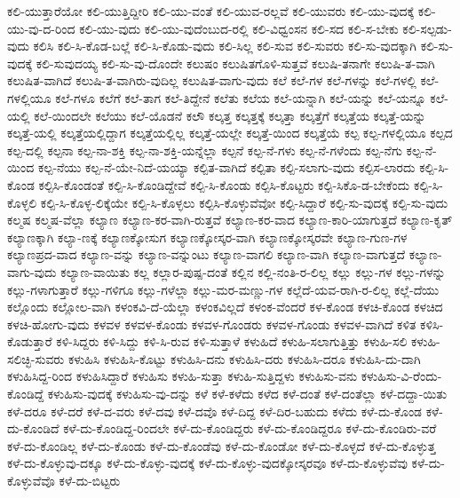 {ಕಲಿ-ಯುತ್ತಾರೆಯೋ
ಕಲಿ-ಯುತ್ತಿದ್ದೀರಿ
ಕಲಿ-ಯು-ವಂತೆ
ಕಲಿ-ಯುವ-ರಲ್ಲವೆ
ಕಲಿ-ಯುವರು
ಕಲಿ-ಯು-ವುದಕ್ಕೆ
ಕಲಿ-ಯು-ವು-ದ-ರಿಂದ
ಕಲಿ-ಯು-ವುದು
ಕಲಿ-ಯು-ವುದೆಂಬುದ-ರಲ್ಲಿ
ಕಲಿ-ವಿಧ್ವಂಸನ
ಕಲಿ-ಸದ
ಕಲಿ-ಸ-ಬೇಕು
ಕಲಿ-ಸಲ್ಪಡು-ವುದು
ಕಲಿಸಿ
ಕಲಿ-ಸಿ-ಕೊಡ-ಬಲ್ಲೆ
ಕಲಿ-ಸಿ-ಕೊಡು-ವುದು
ಕಲಿ-ಸಿಲ್ಲ
ಕಲಿ-ಸುವ
ಕಲಿ-ಸುವರು
ಕಲಿ-ಸು-ವುದಕ್ಕಾಗಿ
ಕಲಿ-ಸು-ವುದಕ್ಕೆ
ಕಲಿ-ಸುವುದಯ್ಯ
ಕಲಿ-ಸು-ವು-ದೊಂದೇ
ಕಲುಷಂ
ಕಲುಷಿತಗೊಳಿ-ಸುತ್ತವೆ
ಕಲುಷಿ-ತನಾಗೇ
ಕಲುಷಿ-ತ-ವಾಗಿ
ಕಲುಷಿತ-ವಾಗಿದೆ
ಕಲುಷಿ-ತ-ವಾಗಿರು-ವುದಿಲ್ಲ
ಕಲುಷಿತ-ವಾಗು-ವುದು
ಕಲೆ
ಕಲೆ-ಗಳ
ಕಲೆ-ಗಳನ್ನು
ಕಲೆ-ಗಳಲ್ಲಿ
ಕಲೆ-ಗಳಲ್ಲಿಯೂ
ಕಲೆ-ಗಳೂ
ಕಲೆಗೆ
ಕಲೆ-ತಾಗ
ಕಲೆ-ತಿದ್ದೇನೆ
ಕಲೆತು
ಕಲೆಯ
ಕಲೆ-ಯನ್ನಾಗಿ
ಕಲೆ-ಯನ್ನು
ಕಲೆ-ಯನ್ನೂ
ಕಲೆ-ಯಲ್ಲಿ
ಕಲೆ-ಯಿಂದಲೇ
ಕಲೆಯು
ಕಲೆ-ಯೊಡನೆ
ಕಲೌ
ಕಲ್ಕತ್ತ
ಕಲ್ಕತ್ತಕ್ಕೆ
ಕಲ್ಕತ್ತಾ
ಕಲ್ಕತ್ತೆಗೆ
ಕಲ್ಕತ್ತೆಯ
ಕಲ್ಕತ್ತೆ-ಯನ್ನು
ಕಲ್ಕತ್ತೆ-ಯಲ್ಲಿ
ಕಲ್ಕತ್ತೆಯಲ್ಲಿದ್ದಾಗ
ಕಲ್ಕತ್ತೆಯಲ್ಲಿಲ್ಲ
ಕಲ್ಕತ್ತೆ-ಯಲ್ಲೇ
ಕಲ್ಕತ್ತೆ-ಯಿಂದ
ಕಲ್ಕತ್ತೆಯೆ
ಕಲ್ಪ
ಕಲ್ಪ-ಗಳಲ್ಲಿಯೂ
ಕಲ್ಪದ
ಕಲ್ಪ-ದಲ್ಲಿ
ಕಲ್ಪನಾ
ಕಲ್ಪ-ನಾ-ಶಕ್ತಿ
ಕಲ್ಪ-ನಾ-ಶಕ್ತಿ-ಯನ್ನೆಲ್ಲಾ
ಕಲ್ಪನೆ
ಕಲ್ಪ-ನೆ-ಗಳು
ಕಲ್ಪ-ನೆ-ಗಳೆಂದು
ಕಲ್ಪ-ನೆಗು
ಕಲ್ಪ-ನೆ-ಯಿಂದ
ಕಲ್ಪ-ನೆಯು
ಕಲ್ಪ-ನೆ-ಯೇ-ನಿದೆ-ಯಯ್ಯಾ
ಕಲ್ಪಿತ-ವಾಗಿದೆ
ಕಲ್ಪಿತಾ
ಕಲ್ಪಿ-ಸಲಾಗು-ವುದು
ಕಲ್ಪಿಸ-ಲಾರದು
ಕಲ್ಪಿ-ಸಿ-ಕೊಂಡ
ಕಲ್ಪಿಸಿ-ಕೊಂಡಂತೆ
ಕಲ್ಪಿ-ಸಿ-ಕೊಂಡಿದ್ದೇವೆ
ಕಲ್ಪಿ-ಸಿ-ಕೊಂಡು
ಕಲ್ಪಿಸಿ-ಕೊಟ್ಟರು
ಕಲ್ಪಿ-ಸಿಕೊ-ಡ-ಬೇಕೆಂದು
ಕಲ್ಪಿ-ಸಿ-ಕೊಳ್ಳಲಿ
ಕಲ್ಪಿ-ಸಿ-ಕೊಳ್ಳ-ಲಿಕ್ಕೆಯೇ
ಕಲ್ಪಿ-ಸಿ-ಕೊಳ್ಳಲು
ಕಲ್ಪಿಸಿ-ಕೊಳ್ಳುವೆವೋ
ಕಲ್ಪಿ-ಸಿದ್ದಾರೆ
ಕಲ್ಪಿ-ಸು-ವುದಕ್ಕೆ
ಕಲ್ಪಿ-ಸು-ವುದು
ಕಲ್ಮಷ
ಕಲ್ಮಷ-ವೆಲ್ಲಾ
ಕಲ್ಯಾಣ
ಕಲ್ಯಾಣ-ಕರ-ವಾಗಿ-ರುತ್ತವೆ
ಕಲ್ಯಾಣ-ಕರ-ವಾದ
ಕಲ್ಯಾಣ-ಕಾರಿ-ಯಾಗುತ್ತದೆ
ಕಲ್ಯಾಣ-ಕೃತ್
ಕಲ್ಯಾಣಕ್ಕಾಗಿ
ಕಲ್ಯಾ-ಣಕ್ಕೆ
ಕಲ್ಯಾಣಕ್ಕೋಸುಗ
ಕಲ್ಯಾಣಕ್ಕೋಸ್ಕರ-ವಾಗಿ
ಕಲ್ಯಾಣಕ್ಕೋಸ್ಕರವೇ
ಕಲ್ಯಾಣ-ಗುಣ-ಗಳ
ಕಲ್ಯಾಣಪ್ರದ-ವಾದ
ಕಲ್ಯಾಣ-ವನ್ನು
ಕಲ್ಯಾಣ-ವನ್ನುಂಟು
ಕಲ್ಯಾಣ-ವಾಗಲಿ
ಕಲ್ಯಾಣ-ವಾಗಿ
ಕಲ್ಯಾಣ-ವಾಗುತ್ತದೆ
ಕಲ್ಯಾಣ-ವಾಗು-ವುದು
ಕಲ್ಯಾಣ-ವಾಯಿತು
ಕಲ್ಲ
ಕಲ್ಲಾರ-ಪುಷ್ಪ-ದಂತೆ
ಕಲ್ಲಿನ
ಕಲ್ಲಿ-ನಂತಿ-ರ-ಲಿಲ್ಲ
ಕಲ್ಲು
ಕಲ್ಲು-ಗಳ
ಕಲ್ಲು-ಗಳನ್ನು
ಕಲ್ಲು-ಗಳಾಗುತ್ತಾರೆ
ಕಲ್ಲು-ಗಳಿಗೂ
ಕಲ್ಲು-ಗಳೆಲ್ಲಾ
ಕಲ್ಲು-ಮರ-ಮಣ್ಣು-ಗಳ
ಕಲ್ಲೆದೆ-ಯವ-ರಾಗಿ-ರ-ಲಿಲ್ಲ
ಕಲ್ಲೆ-ದೆಯು
ಕಲ್ಲೊಂದು
ಕಲ್ಲೋಲ-ವಾಗಿ
ಕಳಂಕವಿ-ದೆ-ಯೆಲ್ಲಾ
ಕಳಂಕವಿಲ್ಲದೆ
ಕಳಂಕ-ವೆಂದರೆ
ಕಳ-ಕೊಂಡ
ಕಳಚಿ-ಕೊಂಡ
ಕಳಚಿದ
ಕಳಚಿ-ಹೋಗು-ವುದು
ಕಳವಳ
ಕಳವಳ-ಕೊಂಡು
ಕಳವಳ-ಗೊಂಡರು
ಕಳವಳ-ಗೊಂಡು
ಕಳವಳ-ವಾಗಿದೆ
ಕಳಿತ
ಕಳಿಸಿ-ಕೊಡುತ್ತಾರೆ
ಕಳಿ-ಸಿದ್ದರು
ಕಳಿ-ಸಿದ್ದು
ಕಳಿ-ಸಿ-ರುವ
ಕಳಿ-ಸುತ್ತಾಳೆ
ಕಳುಹಿದೆ
ಕಳುಹಿ-ಸಲಾಗುತ್ತಿತ್ತು
ಕಳುಹಿ-ಸಲಿ
ಕಳುಹಿ-ಸಲಿಚ್ಛಿ-ಸುವರು
ಕಳುಹಿಸಿ
ಕಳುಹಿಸಿ-ಕೊಟ್ಟು
ಕಳುಹಿಸಿ-ದನು
ಕಳುಹಿಸಿ-ದರು
ಕಳುಹಿಸಿ-ದರೂ
ಕಳುಹಿಸಿ-ದು-ದಾಗಿ
ಕಳುಹಿಸಿದ್ದ-ರಿಂದ
ಕಳುಹಿಸಿದ್ದಾರೆ
ಕಳುಹಿಸು
ಕಳುಹಿ-ಸುತ್ತಾ
ಕಳುಹಿ-ಸುತ್ತಿದ್ದಳು
ಕಳುಹಿಸು-ವನು
ಕಳುಹಿಸು-ವಿ-ರೆಂದು-ಕೊಂಡಿದ್ದೆ
ಕಳುಹಿಸು-ವುದಕ್ಕೆ
ಕಳುಹಿಸು-ವು-ದನ್ನು
ಕಳೆ
ಕಳೆ-ಕಳೆದು
ಕಳೆದ
ಕಳೆ-ದಂತೆ
ಕಳೆ-ದಂತೆಲ್ಲಾ
ಕಳೆ-ದದ್ದಾ-ಯಿತು
ಕಳೆ-ದರೂ
ಕಳೆ-ದರೆ
ಕಳೆ-ದ-ವರು
ಕಳೆ-ದವು
ಕಳೆ-ದವೊ
ಕಳೆ-ದಿದ್ದ
ಕಳೆ-ದಿರ-ಬಹುದು
ಕಳೆದು
ಕಳೆ-ದು-ಕೊಂಡ
ಕಳೆ-ದು-ಕೊಂಡಿದೆ
ಕಳೆ-ದು-ಕೊಂಡಿದ್ದ-ರಿಂದಲೇ
ಕಳೆ-ದು-ಕೊಂಡಿದ್ದರು
ಕಳೆ-ದು-ಕೊಂಡಿದ್ದರೂ
ಕಳೆ-ದು-ಕೊಂಡಿರು-ವರೆ
ಕಳೆ-ದು-ಕೊಂಡಿಲ್ಲ
ಕಳೆ-ದು-ಕೊಂಡು
ಕಳೆ-ದು-ಕೊಂಡೆವು
ಕಳೆ-ದು-ಕೊಂಡೋ
ಕಳೆ-ದು-ಕೊಳ್ಳದೆ
ಕಳೆ-ದು-ಕೊಳ್ಳುತ್ತ
ಕಳೆ-ದು-ಕೊಳ್ಳುವು-ದಕ್ಕೂ
ಕಳೆ-ದು-ಕೊಳ್ಳು-ವುದಕ್ಕೆ
ಕಳೆ-ದು-ಕೊಳ್ಳು-ವುದಕ್ಕೋಸ್ಕರವೂ
ಕಳೆ-ದು-ಕೊಳ್ಳುವೆವು
ಕಳೆ-ದು-ಕೊಳ್ಳುವೆವೊ
ಕಳೆ-ದು-ಬಿಟ್ಟರು
}
